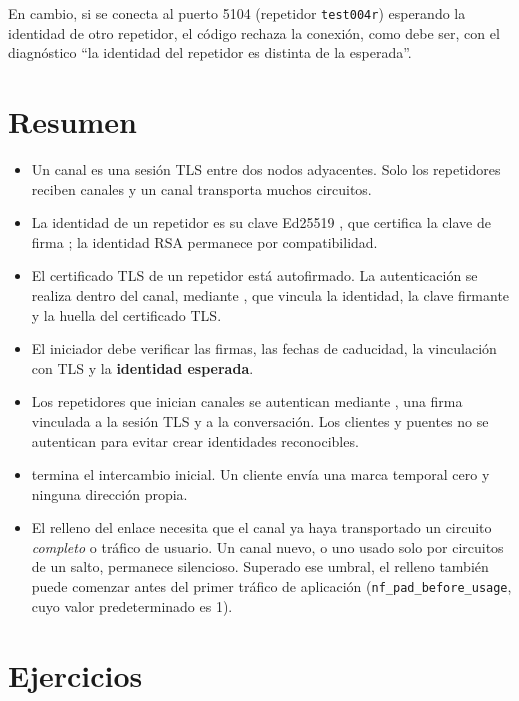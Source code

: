 En cambio, si se conecta al puerto 5104 (repetidor \texttt{test004r}) esperando la identidad de otro repetidor, el código rechaza la conexión, como debe ser, con el diagnóstico \enquote{la identidad del repetidor es distinta de la esperada}.

\section*{Resumen}
\begin{itemize}
  \item Un canal es una sesión TLS entre dos nodos adyacentes. Solo los repetidores reciben canales y un canal transporta muchos circuitos.
  \item La identidad de un repetidor es su clave Ed25519 , que certifica la clave de firma ; la identidad RSA permanece por compatibilidad.
  \item El certificado TLS de un repetidor está autofirmado. La autenticación se realiza dentro del canal, mediante , que vincula la identidad, la clave firmante y la huella del certificado TLS.
  \item El iniciador debe verificar las firmas, las fechas de caducidad, la vinculación con TLS y la \textbf{identidad esperada}.
  \item Los repetidores que inician canales se autentican mediante , una firma vinculada a la sesión TLS y a la conversación. Los clientes y puentes no se autentican para evitar crear identidades reconocibles.
  \item {} termina el intercambio inicial. Un cliente envía una marca temporal cero y ninguna dirección propia.
  \item El relleno del enlace necesita que el canal ya haya transportado un circuito \emph{completo} o tráfico de usuario. Un canal nuevo, o uno usado solo por circuitos de un salto, permanece silencioso. Superado ese umbral, el relleno también puede comenzar antes del primer tráfico de aplicación (\texttt{nf\_pad\_before\_usage}, cuyo valor predeterminado es 1).
\end{itemize}

\section*{Ejercicios}

